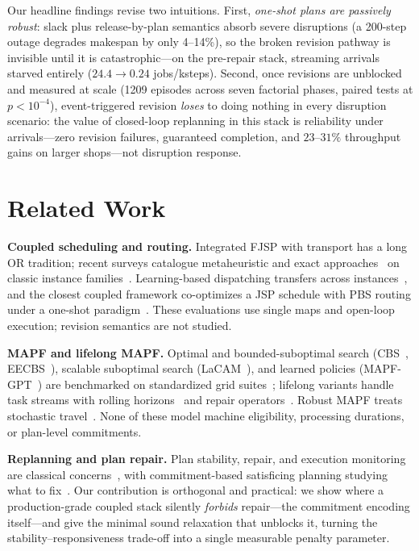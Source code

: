 \documentclass[twocolumn]{article}
\begin{document}
Our headline findings revise two intuitions. First, \emph{one-shot plans
are passively robust}: slack plus release-by-plan semantics absorb severe
disruptions (a 200-step outage degrades makespan by only 4--14\%),
so the broken revision pathway is invisible until it is
catastrophic---on the pre-repair stack, streaming arrivals starved
entirely ($24.4\to0.24$ jobs/ksteps). Second, once revisions are
unblocked and measured at scale (1209 episodes across seven factorial
phases, paired tests at $p<10^{-4}$), event-triggered revision
\emph{loses} to doing nothing in every disruption scenario: the value
of closed-loop replanning in this stack is reliability under
arrivals---zero revision failures, guaranteed completion, and
$23$--$31\%$ throughput gains on larger shops---not disruption
response.

\section{Related Work}
\textbf{Coupled scheduling and routing.} Integrated FJSP with transport
has a long OR tradition; recent surveys catalogue metaheuristic and
exact approaches~\cite{xin2025fjsppt,dauzere2024fjsp} on classic
instance families~\cite{brandimarte1993routing}. Learning-based
dispatching transfers across
instances~\cite{zhang2020l2d,smit2025gnn}, and the closest coupled
framework co-optimizes a JSP schedule with PBS routing under a
one-shot paradigm~\cite{li2026framework}. These evaluations use single
maps and open-loop execution; revision semantics are not studied.

\textbf{MAPF and lifelong MAPF.} Optimal and bounded-suboptimal search
(CBS~\cite{sharon2015cbs}, EECBS~\cite{li2021eecbs}), scalable
suboptimal search (LaCAM~\cite{okumura2023lacam}), and learned policies
(MAPF-GPT~\cite{andreychuk2025mapfgpt}) are benchmarked on standardized
grid suites~\cite{skrynnik2024pogema}; lifelong variants handle task
streams with rolling horizons~\cite{ma2017mapd,li2021rhcr} and repair
operators~\cite{li2022lns2}. Robust MAPF treats stochastic
travel~\cite{vanderwedden2020sttcbs}. None of these model
machine eligibility, processing durations, or plan-level commitments.

\textbf{Replanning and plan repair.} Plan stability, repair, and
execution monitoring are classical concerns~\cite{fox2006plan}, with
commitment-based satisficing planning studying what to
fix~\cite{domshlak2013satisficing}. Our contribution is orthogonal and
practical: we show where a production-grade coupled stack silently
\emph{forbids} repair---the commitment encoding itself---and give the
minimal sound relaxation that unblocks it, turning the
stability--responsiveness trade-off into a single measurable penalty
parameter.
\end{document}
